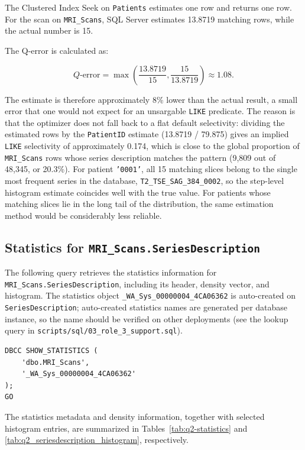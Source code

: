 The Clustered Index Seek on \texttt{Patients} estimates one row and returns one row. For the scan on \texttt{MRI\_Scans}, SQL Server estimates 13.8719 matching rows, while the actual number is 15.

The Q-error is calculated as:

\[
Q\text{-error}=
\max\left(
\frac{13.8719}{15},
\frac{15}{13.8719}
\right)
\approx 1.08.
\]

The estimate is therefore approximately 8\% lower than the actual result, a small error that one would not expect for an unsargable \texttt{LIKE} predicate. The reason is that the optimizer does not fall back to a flat default selectivity: dividing the estimated rows by the \texttt{PatientID} estimate (13.8719 / 79.875) gives an implied \texttt{LIKE} selectivity of approximately 0.174, which is close to the global proportion of \texttt{MRI\_Scans} rows whose series description matches the pattern (9,809 out of 48,345, or 20.3\%). For patient \texttt{'0001'}, all 15 matching slices belong to the single most frequent series in the database, \texttt{T2\_TSE\_SAG\_384\_0002}, so the step-level histogram estimate coincides well with the true value. For patients whose matching slices lie in the long tail of the distribution, the same estimation method would be considerably less reliable.

\subsection{Statistics for \texttt{MRI\_Scans.SeriesDescription}}

The following query retrieves the statistics information for \texttt{MRI\_Scans.SeriesDescription}, including its header, density vector, and histogram. The statistics object \texttt{\_WA\_Sys\_00000004\_4CA06362} is auto-created on \texttt{SeriesDescription}; auto-created statistics names are generated per database instance, so the name should be verified on other deployments (see the lookup query in \texttt{scripts/sql/03\_role\_3\_support.sql}).

\begin{lstlisting}[caption={Retrieving Q2 statistics for MRI\_Scans.SeriesDescription},
                   label={lst:q2-statistics}]
DBCC SHOW_STATISTICS (
    'dbo.MRI_Scans',
    '_WA_Sys_00000004_4CA06362'
);
GO
\end{lstlisting}

The statistics metadata and density information, together with selected histogram entries, are summarized in Tables~\ref{tab:q2-statistics} and \ref{tab:q2_seriesdescription_histogram}, respectively.

